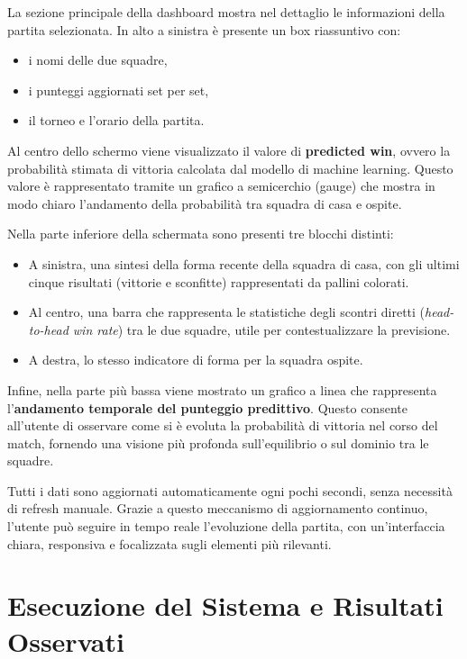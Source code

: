 \documentclass[a4paper,12pt]{report}
\begin{document}
La sezione principale della dashboard mostra nel dettaglio le informazioni della partita selezionata. In alto a sinistra è presente un box riassuntivo con:
\begin{itemize}
  \item i nomi delle due squadre,
  \item i punteggi aggiornati set per set,
  \item il torneo e l’orario della partita.
\end{itemize}

Al centro dello schermo viene visualizzato il valore di \textbf{predicted win}, ovvero la probabilità stimata di vittoria calcolata dal modello di machine learning. Questo valore è rappresentato tramite un grafico a semicerchio (gauge) che mostra in modo chiaro l’andamento della probabilità tra squadra di casa e ospite.

Nella parte inferiore della schermata sono presenti tre blocchi distinti:
\begin{itemize}
  \item A sinistra, una sintesi della forma recente della squadra di casa, con gli ultimi cinque risultati (vittorie e sconfitte) rappresentati da pallini colorati.
  \item Al centro, una barra che rappresenta le statistiche degli scontri diretti (\textit{head-to-head win rate}) tra le due squadre, utile per contestualizzare la previsione.
  \item A destra, lo stesso indicatore di forma per la squadra ospite.
\end{itemize}

Infine, nella parte più bassa viene mostrato un grafico a linea che rappresenta l’\textbf{andamento temporale del punteggio predittivo}. Questo consente all’utente di osservare come si è evoluta la probabilità di vittoria nel corso del match, fornendo una visione più profonda sull’equilibrio o sul dominio tra le squadre.

Tutti i dati sono aggiornati automaticamente ogni pochi secondi, senza necessità di refresh manuale. Grazie a questo meccanismo di aggiornamento continuo, l’utente può seguire in tempo reale l’evoluzione della partita, con un’interfaccia chiara, responsiva e focalizzata sugli elementi più rilevanti.





\chapter{Esecuzione del Sistema e Risultati Osservati}
\end{document}
